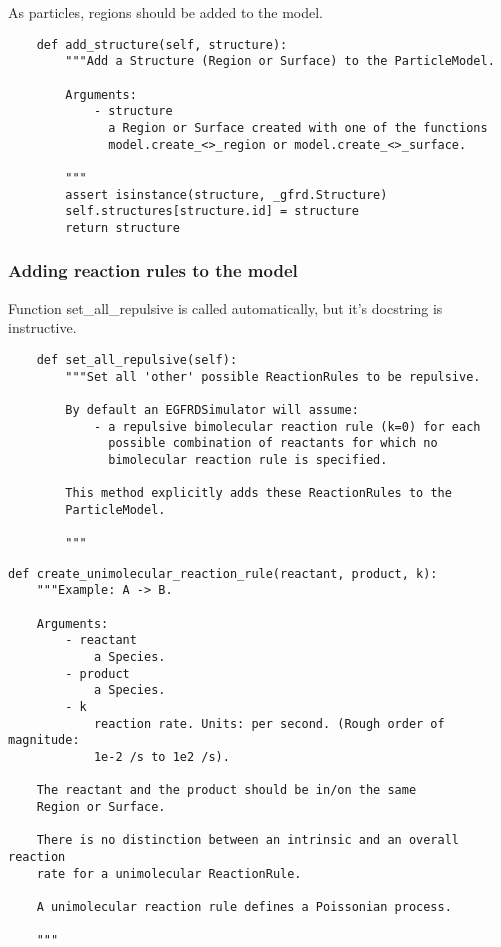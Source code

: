\documentclass[a4paper,10pt]{article}
\begin{document}
As particles, regions should be added to the model. 
\begin{verbatim}
    def add_structure(self, structure):
        """Add a Structure (Region or Surface) to the ParticleModel.

        Arguments:
            - structure
              a Region or Surface created with one of the functions
              model.create_<>_region or model.create_<>_surface.

        """
        assert isinstance(structure, _gfrd.Structure)
        self.structures[structure.id] = structure
        return structure
\end{verbatim}

\subsubsection{Adding reaction rules to the model}

Function set\_all\_repulsive is called automatically, but it's docstring is instructive.
\begin{verbatim}
    def set_all_repulsive(self):
        """Set all 'other' possible ReactionRules to be repulsive.

        By default an EGFRDSimulator will assume:
            - a repulsive bimolecular reaction rule (k=0) for each 
              possible combination of reactants for which no 
              bimolecular reaction rule is specified. 
          
        This method explicitly adds these ReactionRules to the 
        ParticleModel.

        """
\end{verbatim}

\begin{verbatim}
def create_unimolecular_reaction_rule(reactant, product, k):
    """Example: A -> B.

    Arguments:
        - reactant
            a Species.
        - product 
            a Species.
        - k
            reaction rate. Units: per second. (Rough order of magnitude: 
            1e-2 /s to 1e2 /s).

    The reactant and the product should be in/on the same 
    Region or Surface.

    There is no distinction between an intrinsic and an overall reaction 
    rate for a unimolecular ReactionRule.

    A unimolecular reaction rule defines a Poissonian process.

    """
\end{verbatim}
\end{document}
